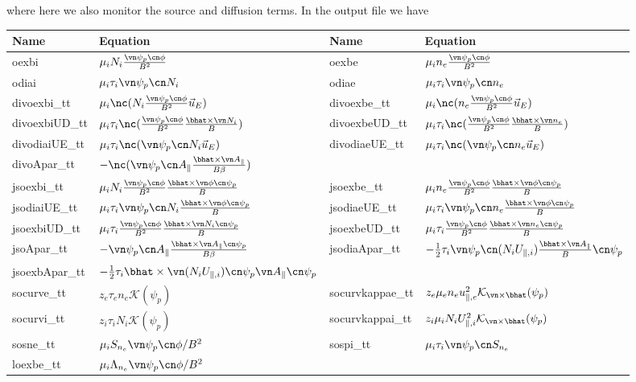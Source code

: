 where here we also monitor the source and diffusion terms.
In the output file we have
\begin{longtable}{llll}
\toprule
\rowcolor{gray!50}\textbf{Name} &  \textbf{Equation}&
\textbf{Name} &  \textbf{Equation}\\
\midrule
    oexbi &$\mu_i N_i \frac{\vn\psi_p\cn\phi}{B^2}$ &
    oexbe &$\mu_i n_e \frac{\vn\psi_p\cn\phi}{B^2}$ \\
    odiai &$\mu_i \tau_i\vn\psi_p\cn N_i$ &
    odiae &$\mu_i \tau_i\vn\psi_p\cn n_e$ \\
    divoexbi\_tt &$\mu_i \nc( N_i \frac{\vn\psi_p\cn\phi}{B^2} \vec u_E)$ &
    divoexbe\_tt &$\mu_i \nc( n_e \frac{\vn\psi_p\cn\phi}{B^2} \vec u_E)$ \\
    divoexbiUD\_tt &$\mu_i\tau_i \nc( \frac{\vn\psi_p\cn\phi}{B^2} \frac{\bhat\times\vn N_i}{B})$ &
    divoexbeUD\_tt &$\mu_i\tau_i \nc( \frac{\vn\psi_p\cn\phi}{B^2} \frac{\bhat\times\vn n_e}{B})$ \\
    divodiaiUE\_tt &$\mu_i \tau_i\nc(\vn\psi_p\cn N_i \vec u_E)$ &
    divodiaeUE\_tt &$\mu_i \tau_i\nc(\vn\psi_p\cn n_e \vec u_E)$ \\
    divoApar\_tt &$ -\nc ( \vn\psi_p\cn A_\parallel \frac{\bhat\times\vn A_\parallel}{B\beta})$ &
    & \\
    jsoexbi\_tt &$\mu_i N_i \frac{\vn\psi_p\cn\phi}{B^2} \frac{\bhat\times\vn\phi\cn \psi_p}{B}$ &
    jsoexbe\_tt &$\mu_i n_e \frac{\vn\psi_p\cn\phi}{B^2} \frac{\bhat\times\vn\phi\cn \psi_p}{B}$ \\
    jsodiaiUE\_tt &$\mu_i \tau_i\vn\psi_p\cn N_i \frac{\bhat\times\vn\phi\cn \psi_p}{B}$ &
    jsodiaeUE\_tt &$\mu_i \tau_i\vn\psi_p\cn n_e \frac{\bhat\times\vn\phi\cn \psi_p}{B}$ \\
    jsoexbiUD\_tt &$\mu_i\tau_i \frac{\vn\psi_p\cn\phi}{B^2} \frac{\bhat\times\vn N_i\cn \psi_p}{B}$ &
    jsoexbeUD\_tt &$\mu_i\tau_i \frac{\vn\psi_p\cn\phi}{B^2} \frac{\bhat\times\vn n_e\cn \psi_p}{B}$ \\
    jsoApar\_tt &$ -\vn\psi_p\cn A_\parallel \frac{\bhat\times\vn A_\parallel\cn \psi_p}{B\beta}$ &
    jsodiaApar\_tt & $ -\frac{1}{2}\tau_i \vn\psi_p\cn  (N_iU_{\parallel,i})\frac{\bhat\times\vn A_\parallel}{B}\cn\psi_p$ \\
    jsoexbApar\_tt & $ -\frac{1}{2}\tau_i \bhat\times\vn  (N_iU_{\parallel,i})\cn\psi_p \vn A_\parallel\cn\psi_p$ &
    & \\
    socurve\_tt &$z_e\tau_e n_e \mathcal K(\psi_p)$ &
    socurvkappae\_tt &$z_e\mu_e n_eu_{\parallel,e}^2 \mathcal K_{\vn\times\bhat}(\psi_p)$ \\
    socurvi\_tt &$z_i\tau_i N_i \mathcal K(\psi_p)$ &
    socurvkappai\_tt &$z_i\mu_i N_iU_{\parallel,i}^2 \mathcal K_{\vn\times\bhat}(\psi_p)$ \\
    sosne\_tt & $\mu_i S_{n_e} \vn\psi_p\cn\phi/B^2$ &
    sospi\_tt & $\mu_i \tau_i \vn\psi_p \cn S_{n_e}$\\
    loexbe\_tt & $ \mu_i \Lambda_{n_e} \vn\psi_p\cn\phi/B^2$ & \\
\bottomrule
\end{longtable}


